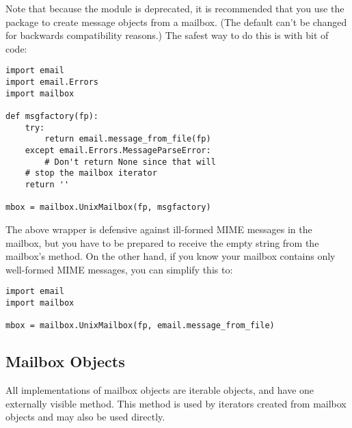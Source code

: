 Note that because the  module is deprecated, it is
recommended that you use the  package to create
message objects from a mailbox.  (The default can't be changed for
backwards compatibility reasons.)  The safest way to do this is with
bit of code:

\begin{verbatim}
import email
import email.Errors
import mailbox

def msgfactory(fp):
    try:
        return email.message_from_file(fp)
    except email.Errors.MessageParseError:
        # Don't return None since that will
	# stop the mailbox iterator
	return ''

mbox = mailbox.UnixMailbox(fp, msgfactory)
\end{verbatim}

The above wrapper is defensive against ill-formed MIME messages in the
mailbox, but you have to be prepared to receive the empty string from
the mailbox's  method.  On the other hand, if you
know your mailbox contains only well-formed MIME messages, you can
simplify this to:

\begin{verbatim}
import email
import mailbox

mbox = mailbox.UnixMailbox(fp, email.message_from_file)
\end{verbatim}

\begin{seealso}
\end{seealso}


\subsection{Mailbox Objects \label{mailbox-objects}}

All implementations of mailbox objects are iterable objects, and
have one externally visible method.  This method is used by iterators
created from mailbox objects and may also be used directly.

